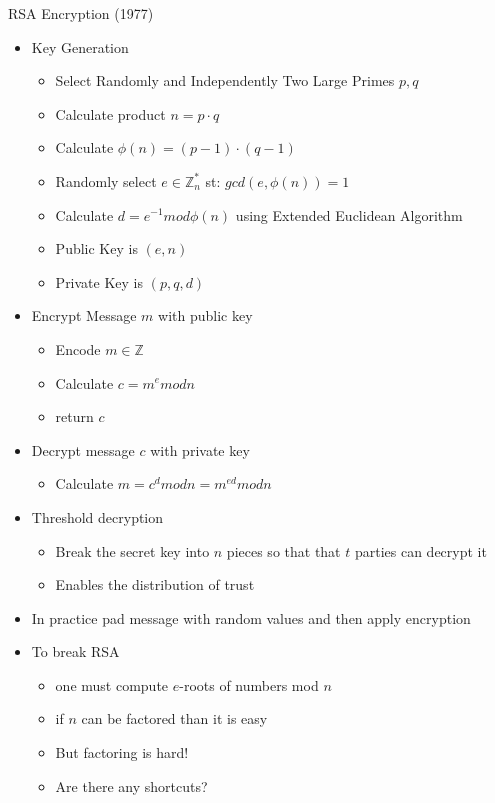 \documentclass{beamer}
\begin{document}
\begin{frame}[allowframebreaks]{RSA Encryption (1977)}
\begin{itemize}
\item Key Generation
\begin{itemize}
\item  Select Randomly and Independently Two Large Primes $p,q$
\item  Calculate product $n = p \cdot q$
\item  Calculate $ \phi(n) = (p-1) \cdot (q-1)$
\item Randomly select $ e \in \mathbb{Z}_{n}^{*}$ st: $gcd(e,\phi(n))=1$
\item Calculate $d = e^{-1} mod \phi(n)$ using Extended Euclidean Algorithm
\item Public Key is $(e,n)$
\item Private Key is $(p,q,d)$
\end{itemize}
\item Encrypt Message $m$ with public key 
\begin{itemize}
\item  Encode $m \in \mathbb{Z}$
\item  Calculate $c = m^e mod n$
\item  return $c$
\end{itemize}
\item Decrypt message $c$ with private key
\begin{itemize}
\item Calculate $m = c^d mod n = m^{ed} mod n$
\end{itemize}

\framebreak

\item Threshold decryption
\begin{itemize}
\item Break the secret key into $n$ pieces so that that $t$ parties can decrypt it
\item Enables the distribution of trust
\end{itemize}

\item In practice pad message with random values and then apply encryption
\item To break RSA
\begin{itemize}
\item one must compute $e$-roots of numbers mod $n$
\item if $n$ can be factored than it is easy
\item But factoring is hard!
\item Are there any shortcuts?
\end{itemize}
\end{itemize}
\end{frame}
\end{document}
